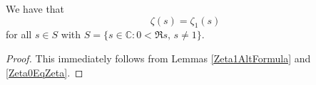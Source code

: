 \begin{theorem}[ZetaAltFormula]
\label{ZetaAltFormula}
\leanok
We have that
    $$\zeta(s)=\zeta_1(s)$$
    for all $s\in S$ with $S=\{s\in\mathbb{C}:0<\mathfrak{R}s,\,s\neq 1\}$.
\end{theorem}
\begin{proof}
\leanok
This immediately follows from Lemmas \ref{Zeta1AltFormula} and \ref{Zeta0EqZeta}.
\end{proof}
